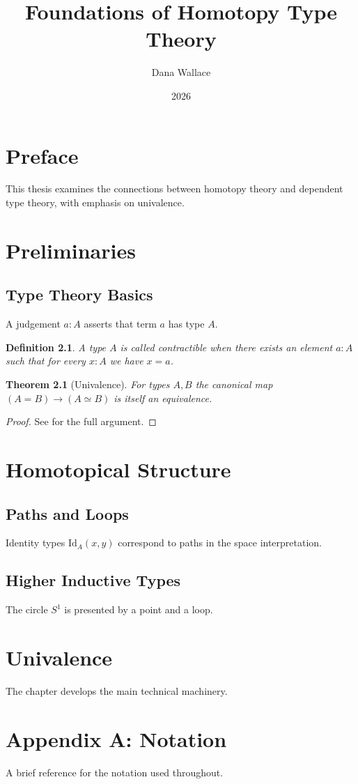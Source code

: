 \documentclass[a4paper,11pt,twoside]{book}
\title{Foundations of Homotopy Type Theory}
\author{Dana Wallace}
\date{2026}
\newtheorem{theorem}{Theorem}[chapter]
\newtheorem{definition}{Definition}[chapter]
\begin{document}
\frontmatter
\maketitle
\tableofcontents
\listoffigures

\chapter{Preface}
This thesis examines the connections between homotopy theory and dependent type theory, with emphasis on univalence.

\mainmatter

\chapter{Preliminaries}
\label{chap:prelim}

\section{Type Theory Basics}
A judgement $a : A$ asserts that term $a$ has type $A$.

\begin{definition}
A type $A$ is called contractible when there exists an element $a : A$ such that for every $x : A$ we have $x = a$.
\end{definition}

\begin{theorem}[Univalence]
For types $A, B$ the canonical map $(A = B) \to (A \simeq B)$ is itself an equivalence.
\end{theorem}

\begin{proof}
See  for the full argument.
\end{proof}

\chapter{Homotopical Structure}

\section{Paths and Loops}
Identity types $\text{Id}_A(x, y)$ correspond to paths in the space interpretation.

\section{Higher Inductive Types}
The circle $S^1$ is presented by a point and a loop.

\chapter{Univalence}
\label{chap:univalence}

The chapter develops the main technical machinery.

\backmatter

\chapter{Appendix A: Notation}
A brief reference for the notation used throughout.
\end{document}
